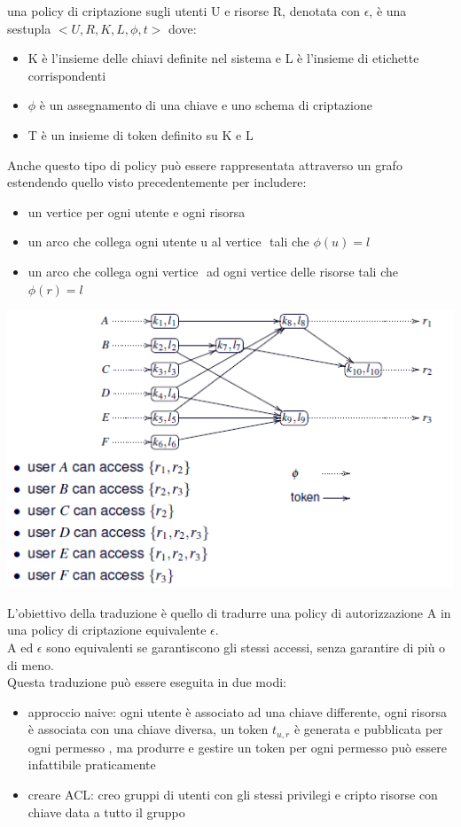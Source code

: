 una policy di criptazione sugli utenti U e risorse R, denotata con \(\epsilon\), è una sestupla \(<U,R,K,L,\phi,t>\) dove:
\begin{itemize}
    \item K è l'insieme delle chiavi definite nel sistema e L è l'insieme di etichette corrispondenti
    \item \(\phi\) è un assegnamento di una chiave e uno schema di criptazione
    \item T è un insieme di token definito su K e L
\end{itemize}
Anche questo tipo di policy può essere rappresentata attraverso un grafo estendendo quello visto precedentemente per includere:
\begin{itemize}
    \item un vertice per ogni utente e ogni risorsa
    \item un arco che collega ogni utente u al vertice \(<k,l>\) tali che \(\phi(u) = l \)
    \item un arco che collega ogni vertice \(<k,l>\) ad ogni vertice delle risorse tali che \(\phi(r) = l \)
\end{itemize}
\begin{center}
    \includegraphics[scale=0.7]{img/epolicy.png}
\end{center}
L'obiettivo della traduzione è quello di tradurre una policy di autorizzazione A in una policy di criptazione equivalente \(\epsilon\).\\
A ed \(\epsilon\) sono equivalenti se garantiscono gli stessi accessi, senza garantire di più o di meno.\\
Questa traduzione può essere eseguita in due modi:
\begin{itemize}
    \item approccio naive: ogni utente è associato ad una chiave differente, ogni risorsa è associata con una chiave diversa, un token \(t_{u,r}\) è generata e pubblicata per ogni permesso \(<u,r>\), ma produrre e gestire un token per ogni permesso può essere infattibile praticamente
    \item creare ACL: creo gruppi di utenti con gli stessi privilegi e cripto risorse con chiave data a tutto il gruppo
\end{itemize}
